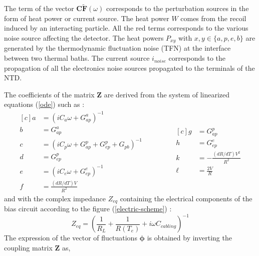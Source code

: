 The term of the vector $\bm{C} \bm{\tilde{F}} (\omega)$ corresponds to the perturbation sources in the form of heat power or current source. The heat power $W$ comes from the recoil induced by an interacting particle.
All the red terms corresponds to the various noise source affecting the detector. The heat powers $P_{xy}$ with $x,y \in \{ a,p,e,b \}$ are generated by the thermodynamic fluctuation noise (TFN) at the interface between two thermal baths. The current source $i_{noise}$ corresponds to the propagation of all the electronics noise sources propagated to the terminals of the NTD.

The coefficients of the matrix $\bm{Z}$ are derived from the system of linearized equations (\ref{ode}) such as :
\begin{equation}
\begin{aligned}[c]
a &=(i C_a \omega + G_{ap}^a)^{-1} \\
b &=G_{ap}^a \\
c &=(i C_p \omega + G_{ap}^p + G_{ep}^p + G_{pb})^{-1} \\
d &=G_{ep}^p \\
e &=(i C_e \omega + G_{ep}^e)^{-1}\\
f &=\frac{(dR/dT) V}{R^2} 
\end{aligned}
\qquad \qquad
\begin{aligned}[c]
g &=G_{ap}^p \\
h &=G_{ep}^e \\
k &=- \frac{(dR/dT) V^{2}}{R^{2}} \\
\ell &=\frac{2 V}{R}
\end{aligned}
\label{coef}
\end{equation}
and with the complex impedance $Z_{eq}$ containing the electrical components of the bias circuit according to the figure (\ref{electric-scheme}) :
\begin{equation}
Z_{eq} = \left(\frac{1}{R_L} + \frac{1}{R(T_e)} + i\omega C_{cabling}\right)^{-1}
\end{equation}
The expression of the vector of fluctuations $\bm{\phi}$ is obtained by inverting the coupling matrix $\bm{Z}$ as, 
